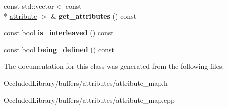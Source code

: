 \begin{DoxyCompactItemize}
\item 
\hypertarget{classoccluded_1_1buffers_1_1attributes_1_1attribute__map_a7c40376c72ad8b85e936213af5abfccf}{const std\+::vector$<$ const \\*
\hyperlink{classoccluded_1_1buffers_1_1attributes_1_1attribute}{attribute} $>$ \& {\bfseries get\+\_\+attributes} () const }\label{classoccluded_1_1buffers_1_1attributes_1_1attribute__map_a7c40376c72ad8b85e936213af5abfccf}

\item 
\hypertarget{classoccluded_1_1buffers_1_1attributes_1_1attribute__map_a378a2e5d7cb0371d45267ef1018f01e0}{const bool {\bfseries is\+\_\+interleaved} () const }\label{classoccluded_1_1buffers_1_1attributes_1_1attribute__map_a378a2e5d7cb0371d45267ef1018f01e0}

\item 
\hypertarget{classoccluded_1_1buffers_1_1attributes_1_1attribute__map_afc2dc57c1bdc2dd5f82a145925243642}{const bool {\bfseries being\+\_\+defined} () const }\label{classoccluded_1_1buffers_1_1attributes_1_1attribute__map_afc2dc57c1bdc2dd5f82a145925243642}

\end{DoxyCompactItemize}


The documentation for this class was generated from the following files\+:\begin{DoxyCompactItemize}
\item 
Occluded\+Library/buffers/attributes/attribute\+\_\+map.\+h\item 
Occluded\+Library/buffers/attributes/attribute\+\_\+map.\+cpp\end{DoxyCompactItemize}
